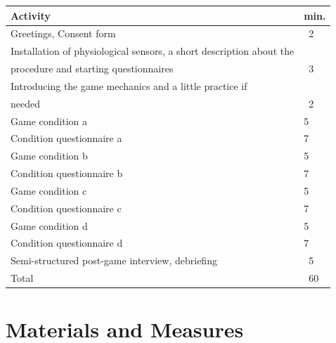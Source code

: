 \documentclass{uofsthesis-cs}
\begin{document}
\begin{center}
\label{tbl:experiment-procedure}
\begin{tabular}{p{10cm} l}
\hline
\rowstyle{\bfseries}
Activity                                                                             & min. \\
\hline
Greetings, Consent form                                                              & ~2 \\
Installation of physiological sensors, a short description about the \\
procedure and starting questionnaires                                                & ~3 \\
Introducing the game mechanics and a little practice if \\ needed                                                                               & ~2 \\
Game condition a                                                                     & 5 \\
Condition questionnaire a                                                            & 7 \\
Game condition b                                                                     & 5 \\
Condition questionnaire b                                                            & 7 \\
Game condition c                                                                     & 5 \\
Condition questionnaire c                                                            & 7 \\
Game condition d                                                                     & 5 \\
Condition questionnaire d                                                            & 7 \\
Semi-structured post-game interview, debriefing                                      & ~5 \\ 
Total                                                                                & ~60 \\ 
\hline
\end{tabular}
\end{center}

\section{Materials and Measures}
\end{document}
